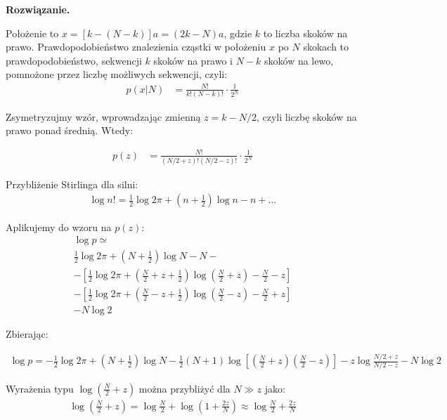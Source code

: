 \documentclass[11pt,a4paper]{article}
\newenvironment{solution}{\vspace{1cm} \par\textbf{Rozwiązanie.} \vspace{1cm}}{}
\begin{document}
\begin{solution}

Położenie to $x = [k - (N - k)]a = (2k - N)a$, gdzie $k$ to liczba skoków na prawo. 
Prawdopodobieństwo znalezienia cząstki w położeniu $x$ po $N$ skokach to
prawdopodobieństwo, sekwencji $k$ skoków na prawo i $N-k$ skoków na lewo,
pomnożone przez liczbę możliwych sekwencji, czyli:
\begin{align*}
    p(x|N) &= \frac{N!}{k!(N-k)!} \cdot \frac{1}{2^N} 
\end{align*}

Zsymetryzujmy wzór, wprowadzając zmienną $z = k - N/2$, 
czyli liczbę skoków na prawo ponad średnią. Wtedy:

\begin{align*}
    p(z) &= \frac{N!}{(N/2 + z)!(N/2 - z)!} \cdot \frac{1}{2^N}
\end{align*}

Przybliżenie Stirlinga dla silni:
\begin{align*}
    \log n! = \frac{1}{2} \log 2\pi + \left(n + \frac{1}{2}\right) \log n - n + \ldots
\end{align*}

Aplikujemy do wzoru na $p(z)$:
\begin{align*}
    \log p \simeq \\
        \frac{1}{2} \log 2\pi + \left(N + \frac{1}{2}\right) \log N - N - \\
       - \left[\frac{1}{2} \log 2\pi + \left(\frac{N}{2} + z + \frac{1}{2}\right) \log \left(\frac{N}{2} + z\right)  - \frac{N}{2} - z\right]  \\
       - \left[\frac{1}{2} \log 2\pi + \left(\frac{N}{2} - z + \frac{1}{2}\right) \log \left(\frac{N}{2} - z\right)  - \frac{N}{2} + z\right]  \\
       - N \log 2 
\end{align*}


Zbierając:

\begin{align*}
    \log p = -\frac{1}{2} \log 2\pi + \left(N + \frac{1}{2}\right) \log N - 
    \frac{1}{2}\left(N + 1\right) \log \left[\left(\frac{N}{2} + z\right) 
    \left(\frac{N}{2} - z\right) \right] - z \log \frac{N/2 + z}{N/2 - z} - N \log 2
\end{align*}

Wyrażenia typu $\log(\frac{N}{2} + z)$ można przybliżyć dla $N \gg z$ jako:
\begin{align*}
    \log(\frac{N}{2} + z) = \log \frac{N}{2} + \log(1 + \frac{2z}{N}) \approx \log \frac{N}{2} + \frac{2z}{N}
\end{align*}



\end{solution}
\end{document}
